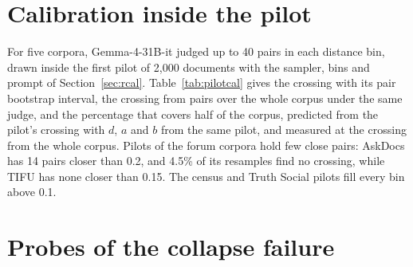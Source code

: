 \section{Calibration inside the pilot}
\label{app:pilotcal}

For five corpora, Gemma-4-31B-it judged up to 40 pairs in each distance bin, drawn inside the first pilot of 2{,}000 documents with the sampler, bins and prompt of Section~\ref{sec:rcal}. Table~\ref{tab:pilotcal} gives the crossing with its pair bootstrap interval, the crossing from pairs over the whole corpus under the same judge, and the percentage that covers half of the corpus, predicted from the pilot's crossing with $d$, $a$ and $b$ from the same pilot, and measured at the crossing from the whole corpus. Pilots of the forum corpora hold few close pairs: AskDocs has 14 pairs closer than 0.2, and 4.5\% of its resamples find no crossing, while TIFU has none closer than 0.15. The census and Truth Social pilots fill every bin above 0.1.

\begin{table}[h]
\centering
\small
{}
\caption{Calibration of $r_{\mathrm{same}}$ inside one pilot, under Gemma. TIFU: bound from the closest pilot pairs, and the prediction at the bound.}
\label{tab:pilotcal}
\end{table}

\section{Probes of the collapse failure}
\label{app:probe}

